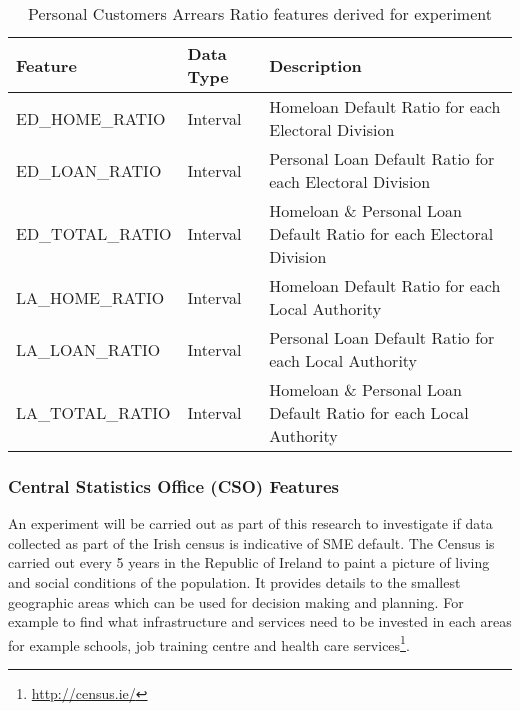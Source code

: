 \begin{table}[H]
	\centering
	\small
	\resizebox{\textwidth}{!}
	{
		\begin{tabular}{|l|l|l|}
			\hline
			\textbf{Feature} & \textbf{Data Type} & \textbf{Description}                                                                                                                                                                                                                                                                                                                                                                                                                                                                                                                              \\ \hline
			ED\_HOME\_RATIO  & Interval & Homeloan Default Ratio for each Electoral Division \\ \hline
			ED\_LOAN\_RATIO  & Interval & Personal Loan Default Ratio for each Electoral Division \\ \hline
			ED\_TOTAL\_RATIO & Interval & Homeloan \& Personal Loan Default Ratio for each Electoral Division \\ \hline
			LA\_HOME\_RATIO  & Interval & Homeloan Default Ratio for each Local Authority \\ \hline
			LA\_LOAN\_RATIO  & Interval & Personal Loan Default Ratio for each Local Authority \\ \hline
			LA\_TOTAL\_RATIO & Interval & Homeloan \& Personal Loan Default Ratio for each Local Authority \\ \hline
		\end{tabular}
	}
	\caption{Personal Customers Arrears Ratio features derived for experiment}
	\label{table:arrears_ratio}
\end{table}

\subsubsection{Central Statistics Office (CSO) Features}
An experiment will be carried out as part of this research to investigate if data collected as part of the Irish census is indicative of SME default. The Census is carried out every 5 years in the Republic of Ireland to paint a picture of living and social conditions of the population. It provides details to the smallest geographic areas which can be used for decision making and planning. For example to find what infrastructure and services need to be invested in each areas for example schools, job training centre and health care services\footnote{\url{http://census.ie/}}. 

